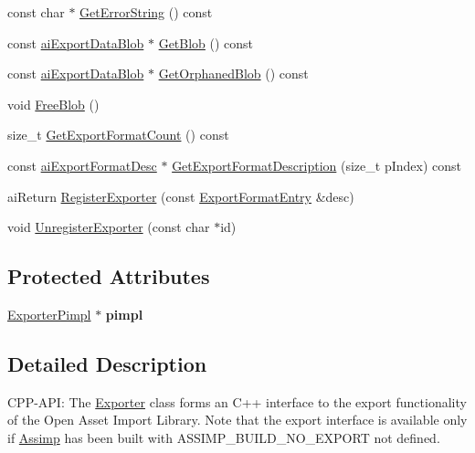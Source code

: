 \begin{DoxyCompactItemize}
\item 
const char $\ast$ \hyperlink{class_assimp_1_1_exporter_a699544ab432d11e568c552c4dc5d67c5}{Get\+Error\+String} () const 
\item 
const \hyperlink{structai_export_data_blob}{ai\+Export\+Data\+Blob} $\ast$ \hyperlink{class_assimp_1_1_exporter_a806dd4b54d426e8ffed7f7faa32e18e1}{Get\+Blob} () const 
\item 
const \hyperlink{structai_export_data_blob}{ai\+Export\+Data\+Blob} $\ast$ \hyperlink{class_assimp_1_1_exporter_a76d1721a7f6a1196af04fe8c46428b4b}{Get\+Orphaned\+Blob} () const 
\item 
void \hyperlink{class_assimp_1_1_exporter_aec06120ec1a7ea3e7e39bd898bf62871}{Free\+Blob} ()
\item 
size\+\_\+t \hyperlink{class_assimp_1_1_exporter_a06215b8aaef07b936fff49e9425507f7}{Get\+Export\+Format\+Count} () const 
\item 
const \hyperlink{structai_export_format_desc}{ai\+Export\+Format\+Desc} $\ast$ \hyperlink{class_assimp_1_1_exporter_ac66998c00c4f4489a3a647c178483c58}{Get\+Export\+Format\+Description} (size\+\_\+t p\+Index) const 
\item 
ai\+Return \hyperlink{class_assimp_1_1_exporter_a01176fd6be11eb44b792cec46302f8df}{Register\+Exporter} (const \hyperlink{struct_assimp_1_1_exporter_1_1_export_format_entry}{Export\+Format\+Entry} \&desc)
\item 
void \hyperlink{class_assimp_1_1_exporter_a3ad6ea287c4f9cad0d771d3e4cc05d49}{Unregister\+Exporter} (const char $\ast$id)
\end{DoxyCompactItemize}
\subsection*{Protected Attributes}
\begin{DoxyCompactItemize}
\item 
\hypertarget{class_assimp_1_1_exporter_a75bc178ae29edc192e1c1935c31c42b2}{\hyperlink{class_assimp_1_1_exporter_pimpl}{Exporter\+Pimpl} $\ast$ {\bfseries pimpl}}\label{class_assimp_1_1_exporter_a75bc178ae29edc192e1c1935c31c42b2}

\end{DoxyCompactItemize}


\subsection{Detailed Description}
C\+P\+P-\/\+A\+P\+I\+: The \hyperlink{class_assimp_1_1_exporter}{Exporter} class forms an C++ interface to the export functionality of the Open Asset Import Library. Note that the export interface is available only if \hyperlink{class_assimp}{Assimp} has been built with A\+S\+S\+I\+M\+P\+\_\+\+B\+U\+I\+L\+D\+\_\+\+N\+O\+\_\+\+E\+X\+P\+O\+R\+T not defined.

